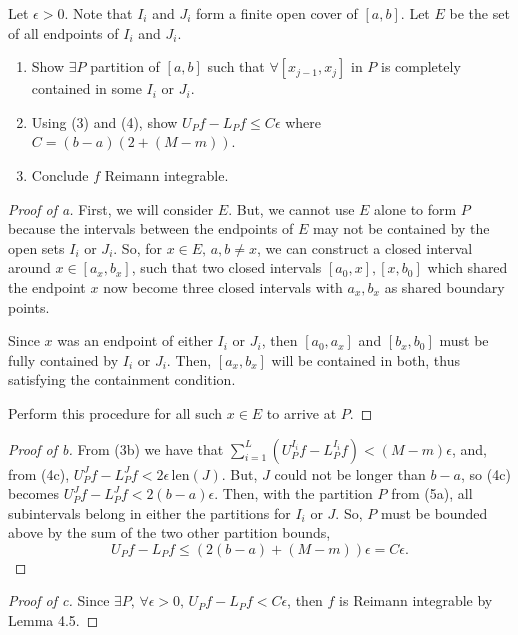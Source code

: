 \documentclass[../hw6]{subfiles}
\begin{document}
\begin{problem}[5]
Let $\epsilon>0$.
Note that  $I_i$ and  $J_i$ form a finite open cover of $[a,b]$.
Let  $E$ be the set of all endpoints of  $I_i$ and  $J_i$.
\begin{enumerate}[label=(\alph*)]
	\item Show $\exists P$ partition of $[a,b]$ such that  $\forall [x_{j-1},x_j]$ in $P$ is completely contained in some $I_i$ or $J_i$.
	\item  Using (3) and (4), show $U_P f - L_P f\le C\epsilon$ where $C=(b-a)(2+(M-m))$.
	\item Conclude $f$ Reimann integrable.
\end{enumerate}
\end{problem}
\begin{proof}[Proof of a]
	First, we will consider $E$.
	But, we cannot use $E$ alone to form $P$ because the intervals between the endpoints of $E$ may not be contained by the open sets $I_i$ or $J_i$.
	So, for $x \in E,\, a,b\neq x$, we can construct a closed interval around $x \in [a_x,b_x]$, such that two closed intervals $[a_0,x],[x,b_0]$ which shared the endpoint $x$ now become three closed intervals with $a_x,b_x$ as shared boundary points.

	Since $x$ was an endpoint of either $I_i$ or  $J_i$, then  $[a_0,a_x]$ and $[b_x,b_0]$ must be fully contained by $I_i$ or $J_i$.
	Then, $[a_x,b_x]$ will be contained in both, thus satisfying the containment condition.

	Perform this procedure for all such $x \in E$ to arrive at $P$.
\end{proof}
\begin{proof}[Proof of b]
	From (3b) we have that $\sum_{i=1 }^{L} (U_P^{I_i} f - L_P^{I_i} f) < (M-m)\epsilon$, and, from (4c), $U_P^{J} f - L_P^{J} f < 2\epsilon\,\text{len}{(J)}$.
	But, $J$ could not be longer than $b-a$, so (4c) becomes $U_P^{J} f - L_P^{J} f < 2(b-a)\epsilon$.
	Then, with the partition $P$ from (5a), all subintervals belong in either the partitions for $I_i$ or  $J$.
	So, $P$ must be bounded above by the sum of the two other partition bounds, \[
		U_P f - L_P f \le (2(b-a)+(M-m))\epsilon = C\epsilon.\]
\end{proof}
\begin{proof}[Proof of c]
	Since $\exists P,\, \forall \epsilon>0,\, U_P f - L_P f < C\epsilon$, then $f$ is Reimann integrable by Lemma 4.5.
\end{proof}
\end{document}
